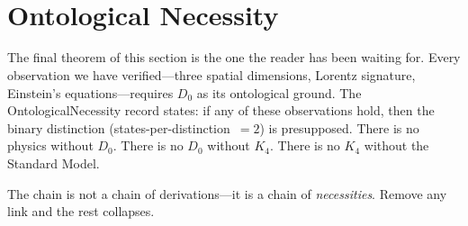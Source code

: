 \documentclass[11pt,a4paper]{book}
\def\texttt#1{#1}%
\begin{document}
\begin{code}
\>[0]\<%
\\
\>[0]\AgdaSpace{}%
\AgdaSymbol{:}\AgdaSpace{}%
\<%
\\
\>[0]\AgdaSpace{}%
\AgdaSymbol{=}\AgdaSpace{}%
\AgdaSpace{}%
\AgdaOperator{\AgdaPrimitive{*}}\AgdaSpace{}%
%
\>[55]\<%
\\
%
\\[\AgdaEmptyExtraSkip]%
\>[0]\<%
\\
\>[0]\AgdaSpace{}%
\AgdaSymbol{:}\AgdaSpace{}%
\<%
\\
\>[0]\AgdaSpace{}%
\AgdaSymbol{=}\AgdaSpace{}%
\AgdaSpace{}%
\AgdaOperator{\AgdaPrimitive{*}}\AgdaSpace{}%
%
\>[50]\<%
\\
%
\\[\AgdaEmptyExtraSkip]%
\>[0]\AgdaSpace{}%
\AgdaSymbol{:}\AgdaSpace{}%
\AgdaSpace{}%
\AgdaSpace{}%
\<%
\\
\>[0]\AgdaSpace{}%
\AgdaSymbol{=}\AgdaSpace{}%
\<%
\end{code}

\section{Ontological Necessity}
\label{sec:ontological-necessity}

The final theorem of this section is the one the reader has been waiting for. Every observation we have verified---three spatial dimensions, Lorentz signature, Einstein's equations---requires $D_0$ as its ontological ground. The \texttt{OntologicalNecessity} record states: if any of these observations hold, then the binary distinction (\texttt{states-per-distinction}~$= 2$) is presupposed. There is no physics without $D_0$. There is no $D_0$ without $K_4$. There is no $K_4$ without the Standard Model.

The chain is not a chain of derivations---it is a chain of \emph{necessities}. Remove any link and the rest collapses.
\end{document}
